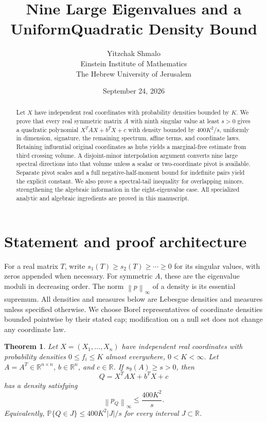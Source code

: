 \documentclass[11pt]{article}
\title{Nine Large Eigenvalues and a Uniform\newline Quadratic Density Bound}
\author{Yitzchak Shmalo\\\small Einstein Institute of Mathematics\\\small The Hebrew University of Jerusalem}
\date{September 24, 2026}
\numberwithin{equation}{section}
\newtheorem{theorem}{Theorem}[section]
\theoremstyle{definition}\newtheorem{definition}[theorem]{Definition}
\theoremstyle{remark}\newtheorem{remark}[theorem]{Remark}
\newcommand{\R}{\mathbb R}\newcommand{\E}{\mathbb E}\newcommand{\PP}{\mathbb P}
\newcommand{\1}{\mathbf 1}\newcommand{\diag}{\operatorname{diag}}
\newcommand{\norm}[1]{\left\lVert#1\right\rVert}\newcommand{\abs}[1]{\left|#1\right|}
\begin{document}
\maketitle
\begin{abstract}
Let $X$ have independent real coordinates with probability densities bounded by $K$. We prove that every real symmetric matrix $A$ with ninth singular value at least $s>0$ gives a quadratic polynomial $X^TAX+b^TX+c$ with density bounded by $400K^2/s$, uniformly in dimension, signature, the remaining spectrum, affine terms, and coordinate laws. Retaining influential original coordinates as hubs yields a marginal-free estimate from third crossing volume. A disjoint-minor interpolation argument converts nine large spectral directions into that volume unless a scalar or two-coordinate pivot is available. Separate pivot scales and a full negative-half-moment bound for indefinite pairs yield the explicit constant. We also prove a spectral-tail inequality for overlapping minors, strengthening the algebraic information in the eight-eigenvalue case. All specialized analytic and algebraic ingredients are proved in this manuscript.
\end{abstract}
\setcounter{tocdepth}{1}
\tableofcontents
\clearpage

\section{Statement and proof architecture}
For a real matrix $T$, write $s_1(T)\ge s_2(T)\ge\cdots\ge0$ for its singular values, with zeros appended when necessary. For symmetric $A$, these are the eigenvalue moduli in decreasing order. The norm $\norm{p}_\infty$ of a density is its essential supremum. All densities and measures below are Lebesgue densities and measures unless specified otherwise. We choose Borel representatives of coordinate densities bounded pointwise by their stated cap; modification on a null set does not change any coordinate law.

\begin{theorem}\label{thm:main}
Let $X=(X_1,\ldots,X_n)$ have independent real coordinates with probability densities $0\le f_i\le K$ almost everywhere, $0<K<\infty$. Let $A=A^T\in\R^{n\times n}$, $b\in\R^n$, and $c\in\R$. If $s_9(A)\ge s>0$, then
\[
 Q=X^TAX+b^TX+c
\]
has a density satisfying
\begin{equation}\label{eq:main}
 \norm{p_Q}_\infty\le\frac{400K^2}{s}.
\end{equation}
Equivalently, $\PP\{Q\in J\}\le400K^2|J|/s$ for every interval $J\subset\R$.
\end{theorem}
\end{document}
